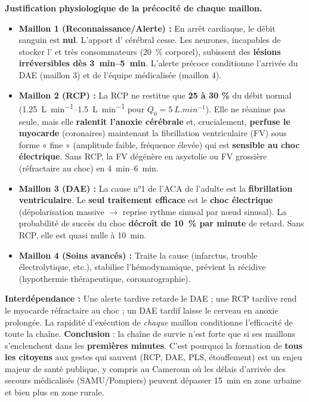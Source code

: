 \documentclass[11pt]{article}
\begin{document}
\begin{exoresolu}
\textbf{Justification physiologique de la précocité de chaque maillon.}
\begin{itemize}
\item \textbf{Maillon 1 (Reconnaissance/Alerte) :} En arrêt cardiaque, le débit sanguin est \textbf{nul}. L'apport d' cérébral cesse. Les neurones, incapables de stocker l' et très consommateurs (\SI{20}{\%}  corporel), subissent des \textbf{lésions irréversibles dès \SIrange{3}{5}{min}}. L'alerte précoce conditionne l'arrivée du DAE (maillon 3) et de l'équipe médicalisée (maillon 4).
\item \textbf{Maillon 2 (RCP) :} La RCP ne restitue que \textbf{25 à 30 \%} du débit normal (\SIrange{1,25}{1,5}{L.min^{-1}} pour $Q_0=\SI{5}{L.min^{-1}}$). Elle ne réanime pas seule, mais elle \textbf{ralentit l'anoxie cérébrale} et, crucialement, \textbf{perfuse le myocarde} (coronaires) maintenant la fibrillation ventriculaire (FV) sous forme « fine » (amplitude faible, fréquence élevée) qui est \textbf{sensible au choc électrique}. Sans RCP, la FV dégénère en asystolie ou FV grossière (réfractaire au choc) en \SIrange{4}{6}{min}.
\item \textbf{Maillon 3 (DAE) :} La cause n°1 de l'ACA de l'adulte est la \textbf{fibrillation ventriculaire}. Le \textbf{seul traitement efficace} est le \textbf{choc électrique} (dépolarisation massive $\rightarrow$ reprise rythme sinusal par nœud sinusal). La probabilité de succès du choc \textbf{décroît de \SI{10}{\%} par minute} de retard. Sans RCP, elle est quasi nulle à \SI{10}{min}.
\item \textbf{Maillon 4 (Soins avancés) :} Traite la cause (infarctus, trouble électrolytique, etc.), stabilise l'hémodynamique, prévient la récidive (hypothermie thérapeutique, coronarographie).
\end{itemize}
\textbf{Interdépendance :} Une alerte tardive retarde le DAE ; une RCP tardive rend le myocarde réfractaire au choc ; un DAE tardif laisse le cerveau en anoxie prolongée. La rapidité d'exécution de \emph{chaque} maillon conditionne l'efficacité de toute la chaîne.
\textbf{Conclusion} : la chaîne de survie n'est forte que si ses maillons s'enclenchent dans les \textbf{premières minutes}. C'est pourquoi la formation de \textbf{tous les citoyens} aux gestes qui sauvent (RCP, DAE, PLS, étouffement) est un enjeu majeur de santé publique, y compris au Cameroun où les délais d'arrivée des secours médicalisés (SAMU/Pompiers) peuvent dépasser \SI{15}{min} en zone urbaine et bien plus en zone rurale.
\end{exoresolu}
\end{document}
